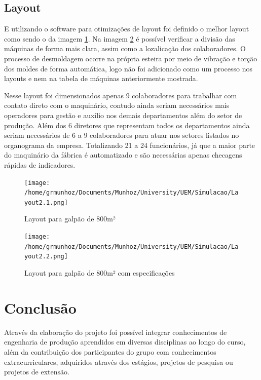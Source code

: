 \documentclass[
	12pt,				%
	openright,			%
	oneside,			%
	a4paper,			%
	english,			%
	french,				%
	spanish,			%
	brazil				%
	]{abntex2}
\begin{document}
\section{Layout}

E utilizando o software para otimizações de layout foi definido o melhor layout como sendo o da imagem \ref{lay}. Na imagem \ref{lay2} é possível verificar a divisão das máquinas de forma mais clara, assim como a lozalicação dos colaboradores. O processo de desmoldagem ocorre na própria esteira por meio de vibração e torção dos moldes de forma automática, logo não foi adicionado como um processo nos layouts e nem na tabela de máquinas anteriormente mostrada.

Nesse layout foi dimensionados apenas 9 colaboradores para trabalhar com contato direto com o maquinário, contudo ainda seriam necessários mais operadores para gestão e auxílio nos demais departamentos além do setor de produção. Além dos 6 diretores que representam todos os departamentos ainda seriam necessários de 6 a 9 colaboradores para atuar nos setores listados no organograma da empresa. Totalizando 21 a 24 funcionários, já que a maior parte do maquinário da fábrica é automatizado e são necessárias apenas checagens rápidas de indicadores.

\begin{figure}[H]
\begin{center}
\caption{Layout para galpão de 800m²}
\texttt{[image: /home/grmunhoz/Documents/Munhoz/University/UEM/Simulacao/Layout2.1.png]} 
\label{lay}
\end{center}
\end{figure}

\begin{figure}[H]
\begin{center}
\caption{Layout para galpão de 800m² com especificações}
\texttt{[image: /home/grmunhoz/Documents/Munhoz/University/UEM/Simulacao/Layout2.2.png]} 
\label{lay2}
\end{center}
\end{figure}


\newpage
\chapter{Conclusão}

Através da elaboração do projeto foi possível integrar conhecimentos de engenharia de produção aprendidos em diversas disciplinas ao longo do curso, além da contribuição dos participantes do grupo com conhecimentos extracurriculares, adquiridos através dos estágios, projetos de pesquisa ou projetos de extensão.
\end{document}
